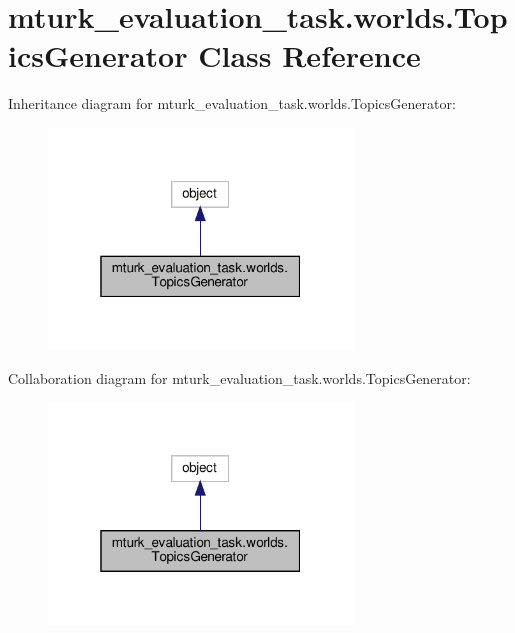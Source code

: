 \hypertarget{classmturk__evaluation__task_1_1worlds_1_1TopicsGenerator}{}\section{mturk\+\_\+evaluation\+\_\+task.\+worlds.\+Topics\+Generator Class Reference}
\label{classmturk__evaluation__task_1_1worlds_1_1TopicsGenerator}


Inheritance diagram for mturk\+\_\+evaluation\+\_\+task.\+worlds.\+Topics\+Generator\+:
\nopagebreak
\begin{figure}[H]
\begin{center}
\leavevmode
\includegraphics[width=229pt]{classmturk__evaluation__task_1_1worlds_1_1TopicsGenerator__inherit__graph}
\end{center}
\end{figure}


Collaboration diagram for mturk\+\_\+evaluation\+\_\+task.\+worlds.\+Topics\+Generator\+:
\nopagebreak
\begin{figure}[H]
\begin{center}
\leavevmode
\includegraphics[width=229pt]{classmturk__evaluation__task_1_1worlds_1_1TopicsGenerator__coll__graph}
\end{center}
\end{figure}
